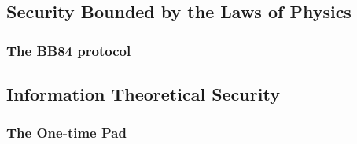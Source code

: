 	\subsection{Security Bounded by the Laws of Physics}
	
		\subsubsection{The BB84 protocol}
	
	\subsection{Information Theoretical Security}
	
		\subsubsection{The One-time Pad}
